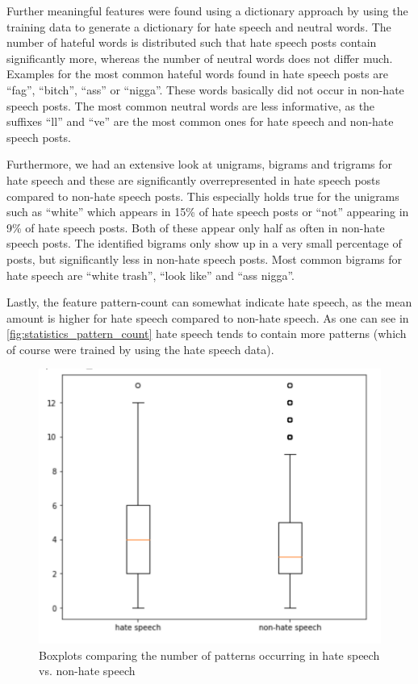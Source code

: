 Further meaningful features were found using a dictionary approach by using the training data to generate a dictionary for hate speech and neutral words. The number of hateful words is distributed such that hate speech posts contain significantly more, whereas the number of neutral words does not differ much.
Examples for the most common hateful words found in hate speech posts are \enquote{fag}, \enquote{bitch}, \enquote{ass} or \enquote{nigga}. These words basically did not occur in non-hate speech posts. The most common neutral words are less informative, as the suffixes \enquote{ll} and \enquote{ve} are the most common ones for hate speech and non-hate speech posts.

Furthermore, we had an extensive look at unigrams, bigrams and trigrams for hate speech and these are significantly overrepresented in hate speech posts compared to non-hate speech posts. This especially holds true for the unigrams such as \enquote{white} which appears in 15\% of hate speech posts or \enquote{not} appearing in 9\% of hate speech posts. Both of these appear only half as often in non-hate speech posts.
The identified bigrams only show up in a very small percentage of posts, but significantly less in non-hate speech posts. Most common bigrams for hate speech are \enquote{white trash}, \enquote{look like} and \enquote{ass nigga}.

Lastly, the feature pattern-count can somewhat indicate hate speech, as the mean amount is higher for hate speech compared to non-hate speech. As one can see in \autoref{fig:statistics_pattern_count} hate speech tends to contain more patterns (which of course were trained by using the hate speech data).

\begin{figure}[ht]
	\centering
	\includegraphics[width=0.7\linewidth]{figures/statistics_pattern_count.png}
	\caption{Boxplots comparing the number of patterns occurring in hate speech vs. non-hate speech}
	\label{fig:statistics_pattern_count}
\end{figure}

